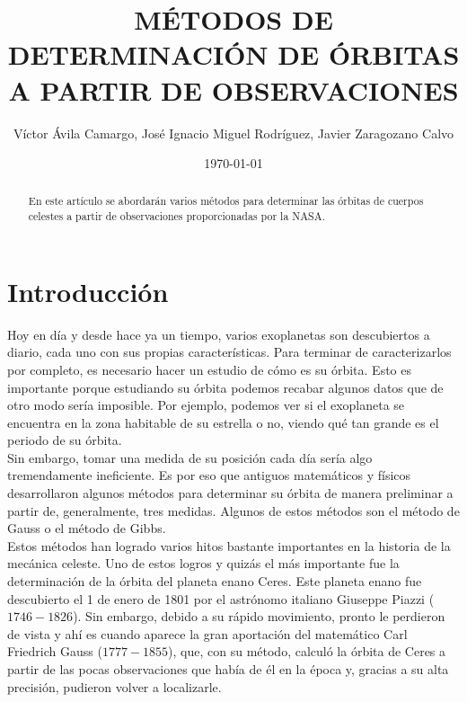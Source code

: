 \documentclass{article}
\title{MÉTODOS DE DETERMINACIÓN DE ÓRBITAS A PARTIR DE OBSERVACIONES}   %
\author{
    Víctor Ávila Camargo, José Ignacio Miguel Rodríguez, Javier Zaragozano Calvo
}
\date{\today}  %
\numberwithin{equation}{section}
\begin{document}
\maketitle
\newpage

\tableofcontents

\newpage

\begin{abstract}
    En este artículo se abordarán varios métodos para determinar 
    las órbitas de cuerpos celestes a partir de observaciones 
    proporcionadas por la NASA.
\end{abstract}
\newpage
\section{Introducción} %
Hoy en día y desde hace ya un tiempo, 
varios exoplanetas son descubiertos a diario, cada uno con sus propias características. 
Para terminar de caracterizarlos por completo, es necesario 
hacer un estudio de cómo es su órbita. Esto es importante porque estudiando su órbita podemos recabar algunos 
datos que de otro modo sería imposible. 
Por ejemplo, podemos ver si el exoplaneta se encuentra en la zona habitable 
de su estrella o no, viendo qué tan grande es el periodo de su 
órbita. \\

Sin embargo, tomar una medida de su posición cada día sería 
algo tremendamente ineficiente. Es por eso que antiguos 
matemáticos y físicos desarrollaron algunos métodos para 
determinar su órbita de manera preliminar a partir de, generalmente, 
tres medidas. Algunos de estos métodos son el método de 
Gauss o el método de Gibbs. \\

Estos métodos han logrado varios hitos bastante importantes 
en la historia de la mecánica celeste. Uno de estos logros 
y quizás el más importante fue la determinación de la órbita 
del planeta enano Ceres. Este planeta enano fue descubierto 
el 1 de enero de 1801 por el astrónomo italiano Giuseppe Piazzi ($1746-1826$). 
Sin embargo, debido a su rápido movimiento, pronto le perdieron 
de vista y ahí es cuando aparece la gran aportación del matemático Carl Friedrich Gauss ($1777-1855$), 
que, con su método, calculó la órbita de Ceres a partir de 
las pocas observaciones que había de él en la época y, gracias 
a su alta precisión, pudieron volver a localizarle. \\
\end{document}
